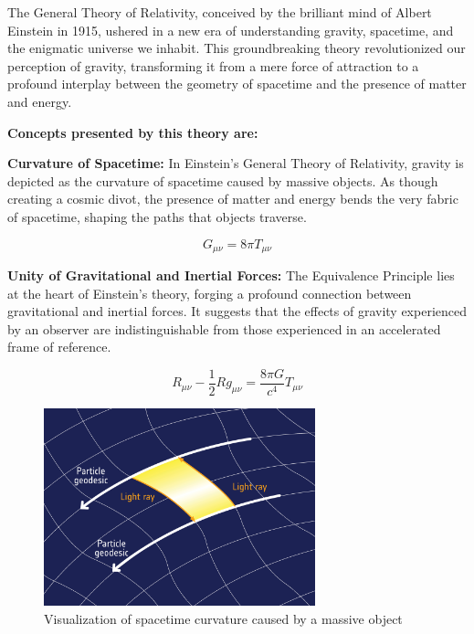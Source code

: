 \documentclass{article}
\begin{document}
\vspace{0.25cm}
\begin{flushleft}
The General Theory of Relativity, conceived by the brilliant mind of Albert Einstein in 1915, ushered in a new era of understanding gravity, spacetime, and the enigmatic universe we inhabit. This groundbreaking theory revolutionized our perception of gravity, transforming it from a mere force of attraction to a profound interplay between the geometry of spacetime and the presence of matter and energy.
\end{flushleft}
\vspace{0.5cm}
\setlength{\parindent}{0em}
\textbf{Concepts presented by this theory are:}
\vspace{0.5cm}
\begin{flushleft}
\textbf{Curvature of Spacetime:} In Einstein's General Theory of Relativity, gravity is depicted as the curvature of spacetime caused by massive objects. As though creating a cosmic divot, the presence of matter and energy bends the very fabric of spacetime, shaping the paths that objects traverse.
\end{flushleft}

\[
G_{\mu\nu} = 8\pi T_{\mu\nu}
\]

\vspace{0.5cm}

\begin{flushleft}
\textbf{Unity of Gravitational and Inertial Forces:} The Equivalence Principle lies at the heart of Einstein's theory, forging a profound connection between gravitational and inertial forces. It suggests that the effects of gravity experienced by an observer are indistinguishable from those experienced in an accelerated frame of reference.
\end{flushleft}

\[
R_{\mu\nu} - \frac{1}{2} R g_{\mu\nu} = \frac{8\pi G}{c^4} T_{\mu\nu}
\]

\vspace{0.5cm}
\begin{figure}[h]
\centering
\includegraphics[width=0.7\textwidth]{Measuring_spacetime_curvature.jpg}
\caption{Visualization of spacetime curvature caused by a massive object}
\label{fig:spacetime_curvature}
\end{figure}
\vspace{0.5cm}
\end{document}
